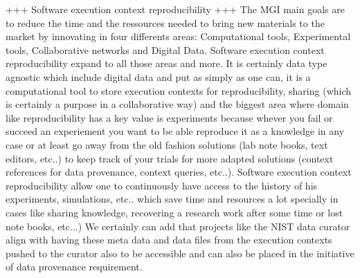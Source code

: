 
+++ Software execution context reproducibility +++
The MGI main goals are to reduce the time and the ressources needed to bring new materials to the market
by innovating in four differents areas: Computational tools, Experimental tools, Collaborative networks
and Digital Data. Software execution context reproducibility expand to all those areas and more. It is certainly data type agnostic
which include digital data and put as simply as one can, it is a computational tool to store execution contexts for
 reproducibility, sharing (which is certainly a purpose in a collaborative way) and the biggest area where domain like reproducibility
has a key value is experiments because whever you fail or succeed an experiement you want to be able reproduce
it as a knowledge in any case or at least go away from the old fashion solutions (lab note books, text editors, etc..)
to keep track of your trials for more adapted solutions (context references for data provenance, context queries, etc..). 
Software execution context reproducibility allow one to continuously have access to the history
of his experiments, simulations, etc.. which save time and resources a lot specially in cases like sharing knowledge,
recovering a research work after some time or lost note books, etc...)
We certainly can add that projects like the NIST data curator align with having these meta data and data files from the execution contexts pushed to the curator also to be accessible and can also be placed in the initiative of data provenance requirement.